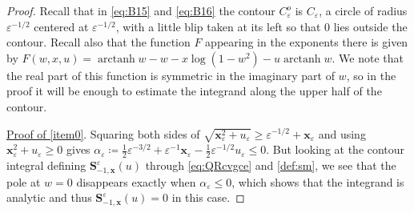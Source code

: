 \documentclass[letterpaper,reqno,11pt,oneside,final]{amsart}
\theoremstyle{definition}
\newcommand{\ep}{\varepsilon}
\DeclareMathOperator\arctanh{arctanh}
\newcommand{\fT}{\mathbf{S}}
\newcommand{\fx}{\mathbf{x}}
\numberwithin{equation}{section}
\begin{document}
\begin{proof}
Recall that in \eqref{eq:B15} and \eqref{eq:B16} the contour $C^o_\ep$ is $C_\ep$, a circle of radius $\ep^{-1/2}$ centered at $\ep^{-1/2}$, with a little blip taken at its left so that $0$ lies outside the contour.
Recall also that the function $F$ appearing in the exponents there is given by $F(w,x,u)= \arctanh w -w - x\log(1- w^2) - u  \arctanh w$.
We note that the real part of this function is symmetric in the imaginary part of $w$, so in the proof it will be enough to estimate the integrand along the upper half of the contour.

\vskip2pt
\noindent\underline{Proof of \ref{item0}}.
Squaring both sides of $\sqrt{\fx_\ep^2+ u_\ep  }\ge \ep^{-1/2}+\fx_\ep$ and using $\fx_\ep^2+ u_\ep \ge 0$ gives $\alpha_\ep\coloneqq \tfrac12\ep^{-3/2}+\ep^{-1}\fx_\ep-\tfrac12\ep^{-1/2} u_\ep\le 0$.
But looking at the contour integral defining $\fT^\ep_{-1,\fx}(u)$ through \eqref{eq:QRcvgce} and \eqref{def:sm}, we see that the pole at $w=0$ disappears exactly when $\alpha_\ep\leq0$, which shows that the integrand is analytic and thus $\fT^\ep_{-1,\fx}(u)=0$ in this case.


\end{proof}
\end{document}
